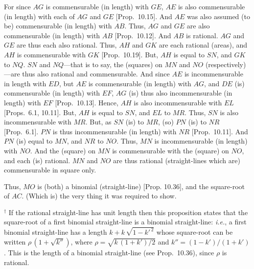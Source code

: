 \begin{Parallel}{}{}
{For since $AG$ is commensurable (in length) with $GE$, $AE$ is also commensurable (in length)
with each of $AG$ and $GE$ [Prop.~10.15]. 
And $AE$ was also assumed (to be) commensurable (in length) with $AB$.  Thus,
$AG$ and $GE$ are also commensurable (in length) with $AB$
[Prop.~10.12]. And $AB$ is rational. $AG$
and $GE$ are thus each also  rational. Thus, $AH$ and $GK$ are each
rational (areas), and $AH$ is commensurable with $GK$ [Prop.~10.19]. But, $AH$ is equal to $SN$,
and $GK$ to $NQ$. $SN$ and $NQ$---that is to say, the (squares)
on $MN$ and $NO$ (respectively)---are thus also rational and commensurable. And since $AE$ is incommensurable in length with $ED$,
but $AE$ is commensurable (in length) with $AG$, and $DE$ (is) commensurable (in length)
with $EF$, $AG$ (is) thus also incommensurable (in length) with $EF$
[Prop.~10.13]. Hence, $AH$ is also incommensurable with $EL$ [Props.~6.1, 10.11]. But, $AH$ is equal to $SN$, and $EL$
to $MR$. Thus, $SN$ is also incommensurable with $MR$. But, as
$SN$ (is) to $MR$, (so) $PN$ (is) to $NR$ [Prop.~6.1].  $PN$ is thus incommensurable (in length) with $NR$ [Prop.~10.11]. And $PN$ (is) equal to $MN$, and $NR$ to
$NO$. Thus, $MN$ is incommensurable (in length) with $NO$. And the (square)
on $MN$ is commensurable with the (square) on $NO$, and each (is)
rational.  $MN$ and $NO$ are thus rational (straight-lines which are)
commensurable in square only.

Thus, $MO$ is (both) a binomial (straight-line) [Prop. 10.36], and the square-root of $AC$.
(Which is) the very thing it was required to show.}
\end{Parallel}
{\footnotesize\noindent $^\dag$ If the rational straight-line has unit length then this proposition states that the square-root of 
a first binomial straight-line is a binomial straight-line: {\em i.e.}, 
a first binomial straight-line has a length $k+k\,\sqrt{1-{k'}^{\,2}}$ whose
square-root can be written $\rho\,(1+\sqrt{k''})$, where $\rho=\sqrt{k\,(1+k')/2}$ and $k''=(1-k')/(1+k')$. This is the length of a binomial straight-line (see Prop.~10.36), since $\rho$ is rational.}

